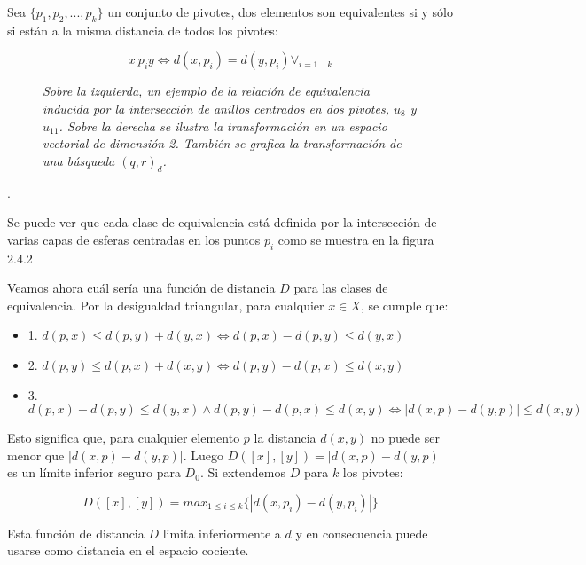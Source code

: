 Sea $\{p_1, p_2,...,p_k\}$ un conjunto de pivotes, dos elementos son equivalentes si y s\'olo si est\'an a la misma distancia de todos los pivotes:

\[
x ~ p_i  y \Leftrightarrow d(x,p_i) = d(y,p_i) \forall_{i = 1....k}
\]

\begin{figure}[htb]
\centerline{ %
   \vspace{.2in}
   }
   \caption [Relaci\'on de equivalencia inducida por dos pivotes y su
   correspondiente transformaci\'on en un espacio vectorial]
     {\textsl{\footnotesize{Sobre la izquierda, un ejemplo de la relaci\'on de equivalencia inducida
        por la intersecci\'on de anillos centrados en dos pivotes, $u_8$ y $u_{11}$.
        Sobre la derecha se ilustra la transformaci\'on en un espacio vectorial de dimensi\'on 2.
    	Tambi\'en se grafica la transformaci\'on de una b\'usqueda $(q,r)_d$. }}}
\label{piv1}
\end{figure}. 

Se puede ver que cada clase de equivalencia est\'a definida por la intersecci\'on de varias capas de esferas centradas en los puntos $p_i$ como se muestra en la figura 2.4.2

Veamos ahora cu\'al ser\'ia una funci\'on de distancia $D$ para las clases de equivalencia.  
Por la desigualdad triangular, para cualquier $x \in X$, se cumple que:

\begin{itemize}
\item 1. $d(p,x) \leq d(p,y) + d(y,x) \Leftrightarrow d(p,x) - d(p,y) \leq d(y,x)$
\item 2. $d(p,y) \leq d(p,x) + d(x,y) \Leftrightarrow d(p,y) - d(p,x) \leq d(x,y)$
\item 3. $d(p,x) - d(p,y) \leq d(y,x) \wedge d(p,y) - d(p,x) \leq d(x,y) \Leftrightarrow |d(x,p) - d(y,p)| \leq d(x,y)$
\end{itemize}

Esto significa que, para cualquier elemento $p$ la distancia $d(x,y)$ no puede ser menor que  
$|d(x,p) - d(y,p)|$. Luego  $D([x],[y]) = |d(x,p) - d(y,p)|$  es un l\'imite inferior seguro 
para $D_0$. Si extendemos $D$ para $k$ los pivotes:

\[
D([x],[y]) = max_{1 \leq i \leq k} \{ |d(x,p_i) - d(y,p_i)|\} 
\]


Esta funci\'on de distancia $D$ limita inferiormente a $d$ y en consecuencia puede usarse como distancia en el espacio cociente.

